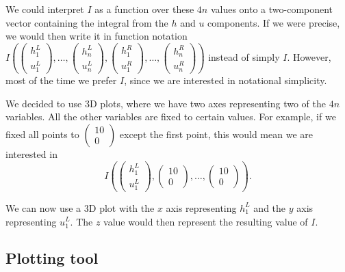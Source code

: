 \documentclass{article}
\begin{document}
We could interpret $I$ as a function over these $4n$ values onto a two-component vector containing the integral from the $h$ and $u$ components. If we were precise, we would then write it in function notation $
I\left(\begin{pmatrix}
    h_1^L \\ u_1^L
  \end{pmatrix},\dots,
  \begin{pmatrix}
    h_n^L \\ u_n^L
  \end{pmatrix},
  \begin{pmatrix}
    h_1^R \\ u_1^R
  \end{pmatrix},\dots,
  \begin{pmatrix}
    h_n^R \\ u_n^R
  \end{pmatrix}\right)$ instead of simply $I$. However, most of the time we prefer $I$, since we are interested in notational simplicity.

We decided to use 3D plots, where we have two axes representing two of the $4n$ variables. All the other variables are fixed to certain values.
For example, if we fixed all points to $
\begin{pmatrix}
  10 \\ 0
\end{pmatrix}
$ except the first point, this would mean we are interested in 
\begin{equation*}
  I\left(
    \begin{pmatrix}
      h_1^L \\ u_1^L
    \end{pmatrix},
    \begin{pmatrix}
      10 \\ 0
    \end{pmatrix}, \dots,
    \begin{pmatrix}
      10 \\ 0
    \end{pmatrix}
  \right).
\end{equation*}

We can now use a 3D plot with the $x$ axis representing $h_1^L$ and the $y$ axis representing $u_1^L$. The $z$ value would then represent the resulting value of $I$.

\subsection{Plotting tool}
\label{sec:plotting-tool-intro}
\end{document}
